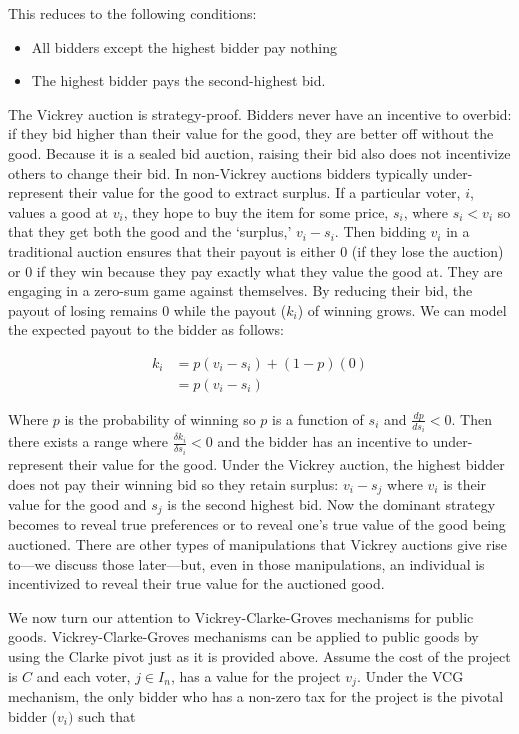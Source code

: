 \documentclass{amsart}
\theoremstyle{plain}
\begin{document}
    
\vskip 0.25cm

This reduces to the following conditions:

\begin{itemize}
\item All bidders except the highest bidder pay nothing
\item The highest bidder pays the second-highest bid. 
\end{itemize}

The Vickrey auction is strategy-proof. Bidders never have an incentive to overbid: if they bid higher than their value for the good, they are better off without the good. Because it is a sealed bid auction, raising their bid also does not incentivize others to change their bid. In non-Vickrey auctions bidders typically under-represent their value for the good to extract surplus. If a particular voter, $i$, values a good at $v_i$, they hope to buy the item for some price, $s_i$, where $s_i < v_i$ so that they get both the good and the `surplus,' $v_i - s_i$. Then bidding $v_i$ in a traditional auction ensures that their payout is either 0 (if they lose the auction) or 0 if they win because they pay exactly what they value the good at. They are engaging in a zero-sum game against themselves. By reducing their bid, the payout of losing remains 0 while the payout ($k_i$) of winning grows. We can model the expected payout to the bidder as follows:

\begin{align*}
    k_i &= p(v_i - s_i) + (1-p)(0) \\
    &= p(v_i - s_i)
\end{align*}

Where $p$ is the probability of winning so $p$ is a function of $s_i$ and $\frac{d p}{d s_i} < 0$. Then there exists a range where $\frac{\delta k_i}{\delta s_i} < 0$ and the bidder has an incentive to under-represent their value for the good. Under the Vickrey auction, the highest bidder does not pay their winning bid so they retain surplus: $v_i -s_j$ where $v_i$ is their value for the good and $s_j$ is the second highest bid. Now the dominant strategy becomes to reveal true preferences or to reveal one's true value of the good being auctioned. There are other types of manipulations that Vickrey auctions give rise to—we discuss those later—but, even in those manipulations, an individual is incentivized to reveal their true value for the auctioned good.

We now turn our attention to Vickrey-Clarke-Groves mechanisms for public goods. Vickrey-Clarke-Groves mechanisms can be applied to public goods by using the Clarke pivot just as it is provided above. Assume the cost of the project is $C$ and each voter, $j \in I_n$, has a value for the project $v_j$. Under the VCG mechanism, the only bidder who has a non-zero tax for the project is the pivotal bidder ($v_i)$ such that 
\end{document}

